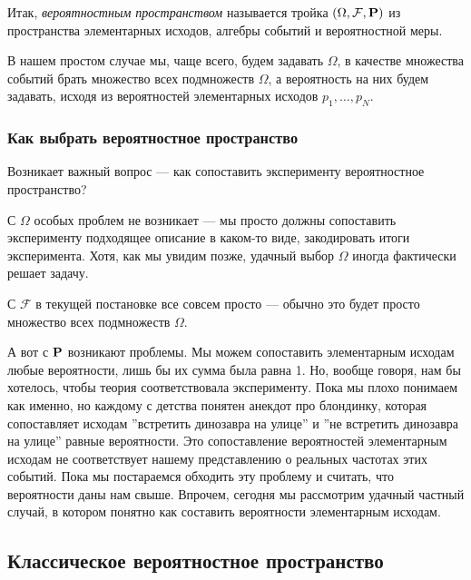 \documentclass[11 pt,russian]{article}
\begin{document}
\begin{Def}
Итак, {\it вероятностным пространством} называется тройка $(\Omega,\mathcal{F},{\bf P})$ из пространства элементарных исходов, алгебры событий и вероятностной меры.
\end{Def}
В нашем простом случае мы, чаще всего, будем задавать $\Omega$, в качестве множества событий брать множество всех подмножеств $\Omega$, а вероятность на них будем задавать, исходя из вероятностей элементарных исходов $p_1,\dotsc, p_N$.
\subsubsection{Как выбрать вероятностное пространство}
Возникает важный вопрос --- как сопоставить эксперименту вероятностное пространство?

С $\Omega$ особых проблем не возникает --- мы просто должны сопоставить эксперименту подходящее описание в каком-то виде, закодировать итоги эксперимента. Хотя, как мы увидим позже, удачный выбор $\Omega$ иногда фактически решает задачу.

С $\mathcal{F}$ в текущей постановке все совсем просто --- обычно это будет просто множество всех подмножеств $\Omega$.

А вот с ${\bf P}$ возникают проблемы. Мы можем сопоставить элементарным исходам любые вероятности, лишь бы их сумма была равна 1. Но, вообще говоря, нам бы хотелось, чтобы теория соответствовала эксперименту. Пока мы плохо понимаем как именно, но каждому с детства понятен анекдот про блондинку, которая сопоставляет исходам ''встретить динозавра на улице'' и ''не встретить динозавра на улице'' равные вероятности. Это сопоставление вероятностей элементарным исходам не соответствует нашему представлению о реальных частотах этих событий. Пока мы постараемся обходить эту проблему и считать, что вероятности даны нам свыше. Впрочем, сегодня мы рассмотрим удачный частный случай, в котором понятно как составить вероятности элементарным исходам.

\subsection{Классическое вероятностное пространство}
\end{document}

